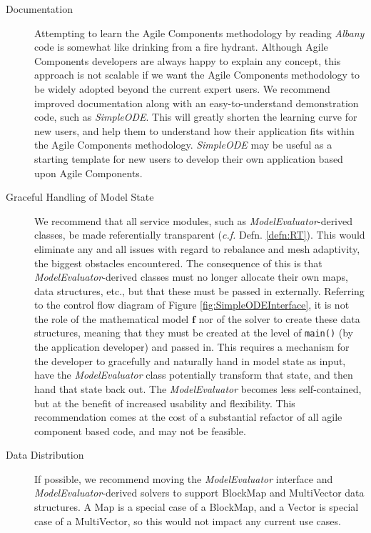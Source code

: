 \documentclass[pdf,ps2pdf,12pt,report]{SANDreport}
\theoremstyle{plain}
\theoremstyle{definition}
\theoremstyle{remark}
\numberwithin{equation}{section}
\begin{document}
\begin{description}
  \item[Documentation] Attempting to learn the Agile Components methodology by reading \emph{Albany} code is somewhat like drinking from a fire hydrant. Although Agile Components developers are always happy to explain any concept, this approach is not scalable if we want the Agile Components methodology to be widely adopted beyond the current expert users. We recommend improved documentation along with an easy-to-understand demonstration code, such as \emph{SimpleODE}. This will greatly shorten the learning curve for new users, and help them to understand how their application fits within the Agile Components methodology. \emph{SimpleODE} may be useful as a starting template for new users to develop their own application based upon Agile Components.
  \item[Graceful Handling of Model State] We recommend that all service modules, such as \emph{ModelEvaluator}-derived classes, be made referentially transparent (\emph{c.f.} Defn. \ref{defn:RT}). This would eliminate any and all issues with regard to rebalance and mesh adaptivity, the biggest obstacles encountered. The consequence of this is that \emph{ModelEvaluator}-derived classes must no longer allocate their own maps, data structures, etc., but that these must be passed in externally. Referring to the control flow diagram of Figure \ref{fig:SimpleODEInterface}, it is not the role of the mathematical model $\mathbf{f}$ nor of the solver to create these data structures, meaning that they must be created at the level of \texttt{main()} (by the application developer) and passed in. This requires a mechanism for the developer to gracefully and naturally hand in model state as input, have the \emph{ModelEvaluator} class potentially transform that state, and then hand that state back out. The \emph{ModelEvaluator} becomes less self-contained, but at the benefit of increased usability and flexibility. This recommendation comes at the cost of a substantial refactor of all agile component based code, and may not be feasible.
  \item[Data Distribution] If possible, we recommend moving the \emph{ModelEvaluator} interface and \emph{ModelEvaluator}-derived solvers to support BlockMap and MultiVector data structures. A Map is a special case of a BlockMap, and a Vector is special case of a MultiVector, so this would not impact any current use cases.

\end{description}
\end{document}
